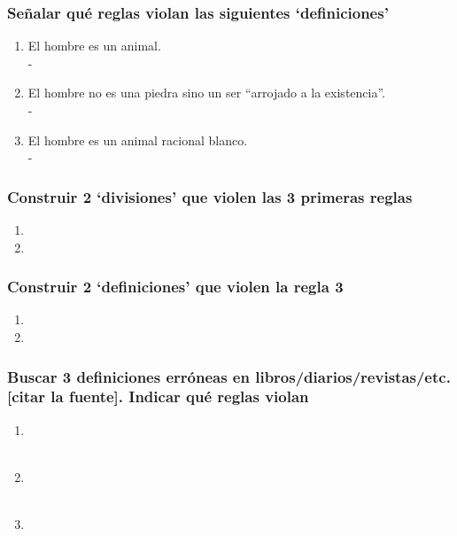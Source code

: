 \documentclass{article}
\begin{document}
\subsubsection{Señalar qué reglas violan las siguientes `definiciones'}
\begin{enumerate}
    \item El hombre es un animal. \\
    -
    \item El hombre no es una piedra sino un ser ``arrojado a la existencia''. \\
    -
    \item El hombre es un animal racional blanco. \\ 
    -
\end{enumerate}
    
\subsubsection{Construir 2 `divisiones' que violen las 3 primeras reglas}
\begin{enumerate}
    \item
    \item
\end{enumerate}
    
\subsubsection{Construir 2 `definiciones' que violen la regla 3}
\begin{enumerate}
    \item 
    \item
\end{enumerate}
    
\subsubsection{Buscar 3 definiciones erróneas en libros/diarios/revistas/etc. [citar la fuente]. Indicar qué reglas violan}
\begin{enumerate}
    \item \ \\ \ \\
    \item \ \\ \ \\
    \item \
\end{enumerate}
    
\newpage 
    
\end{document}
